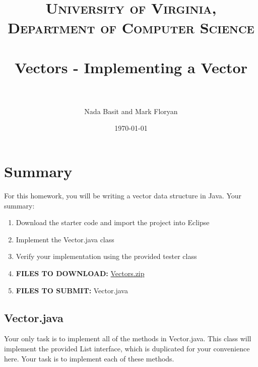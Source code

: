 \documentclass[paper=a4, fontsize=11pt, parskip=full]{scrartcl} %
\title{
\normalfont \normalsize
\textsc{University of Virginia, Department of Computer Science} \\ [25pt] %
\horrule{0.5pt} \\[0.4cm] %
\huge Vectors - Implementing a Vector \\ %
\horrule{2pt} \\[0.5cm] %
}
\author{Nada Basit and Mark Floryan}
\date{\normalsize\today} %
\numberwithin{equation}{section} %
\numberwithin{figure}{section} %
\numberwithin{table}{section} %
\begin{document}
\maketitle %


\section{Summary}

For this homework, you will be writing a vector data structure in Java. Your summary:

\begin{enumerate}
	\item Download the starter code and import the project into Eclipse
	\item Implement the Vector.java class
	\item Verify your implementation using the provided tester class
	\item \textbf{FILES TO DOWNLOAD:} \href{https://uva-cs.github.io/dsa1/homeworks/Vectors/code/Vectors.zip}{Vectors.zip}
	\item \textbf{FILES TO SUBMIT:} Vector.java
\end{enumerate}


\subsection{Vector.java}

Your only task is to implement all of the methods in Vector.java. This class will implement the provided List interface, which is duplicated for your convenience here. Your task is to implement each of these methods.
\end{document}
